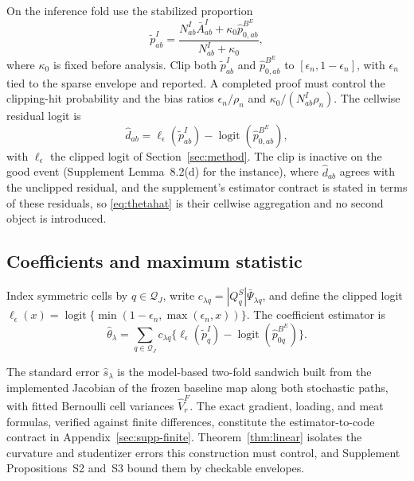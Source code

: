 \documentclass[11pt]{article}
\theoremstyle{definition}
\newcommand{\1}{\mathbf 1}\newcommand{\op}{\operatorname}
\newcommand{\logit}{\operatorname{logit}}\newcommand{\supp}{\operatorname{supp}}
\newcommand{\cQ}{\mathcal Q}\newcommand{\cL}{\mathcal L}\newcommand{\cB}{\mathcal B}
\begin{document}
On the inference fold use the stabilized proportion
\begin{equation}
 \widetilde p_{ab}^I=
 \frac{N_{ab}^I\bar A_{ab}^I+\kappa_0\widehat p_{0,ab}^{B^E}}
 {N_{ab}^I+\kappa_0},                                                       \label{eq:stabilize}
\end{equation}
where $\kappa_0$ is fixed before analysis.  Clip both $\widetilde p_{ab}^I$ and $\widehat p_{0,ab}^{B^E}$ to $[\epsilon_n,1-\epsilon_n]$, with $\epsilon_n$ tied to the sparse envelope and reported.  A completed proof must control the clipping-hit probability and the bias ratios $\epsilon_n/\rho_n$ and $\kappa_0/(N_{ab}^I\rho_n)$.  The cellwise residual logit is
\begin{equation}
 \widehat d_{ab}=\ell_\epsilon(\widetilde p_{ab}^I)-\logit(\widehat p_{0,ab}^{B^E}),\label{eq:reslogit}
\end{equation}
with $\ell_\epsilon$ the clipped logit of Section~\ref{sec:method}.  The clip
is inactive on the good event (Supplement Lemma~8.2(d) for the instance), where
$\widehat d_{ab}$ agrees with the unclipped residual, and the supplement's
estimator contract is stated in terms of these residuals, so \eqref{eq:thetahat}
is their cellwise aggregation and no second object is introduced.

\subsection{Coefficients and maximum statistic}

Index symmetric cells by $q\in\cQ_J$, write
$c_{\lambda q}=|Q_q^S|\bar\Psi_{\lambda q}$, and define the clipped logit
$\ell_\epsilon(x)=\logit\{\min(1-\epsilon_n,\max(\epsilon_n,x))\}$.
The coefficient estimator is
\begin{equation}
 \widehat\theta_\lambda
 =\sum_{q\in\cQ_J}c_{\lambda q}
  \{\ell_\epsilon(\widetilde p_q^I)
    -\logit(\widehat p_{0q}^{B^E})\}.                           \label{eq:thetahat}
\end{equation}

The standard error $\widehat s_\lambda$ is the model-based two-fold sandwich
built from the implemented Jacobian of the frozen baseline map along both
stochastic paths, with fitted Bernoulli cell variances $\widehat V_r^F$.  The
exact gradient, loading, and meat formulas, verified against finite differences,
constitute the estimator-to-code contract in Appendix~\ref{sec:supp-finite}.
Theorem~\ref{thm:linear} isolates the curvature and studentizer
errors this construction must control, and
Supplement Propositions~S2 and~S3 bound them by checkable
envelopes.
\end{document}
